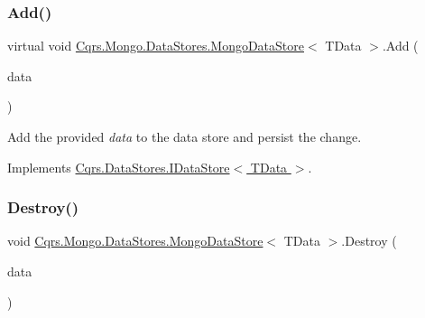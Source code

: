 \mbox{\label{classCqrs_1_1Mongo_1_1DataStores_1_1MongoDataStore_a38c242b255dc17cf8d19470fdf5a99bf}} 
\subsubsection{\texorpdfstring{Add()}{Add()}\hspace{0.1cm}{\footnotesize\ttfamily [2/2]}}
{\footnotesize\ttfamily virtual void \hyperlink{classCqrs_1_1Mongo_1_1DataStores_1_1MongoDataStore}{Cqrs.\+Mongo.\+Data\+Stores.\+Mongo\+Data\+Store}$<$ T\+Data $>$.Add (\begin{DoxyParamCaption}\item[{I\+Enumerable$<$ T\+Data $>$}]{data }\end{DoxyParamCaption})\hspace{0.3cm}{\ttfamily [virtual]}}



Add the provided {\itshape data}  to the data store and persist the change. 



Implements \hyperlink{interfaceCqrs_1_1DataStores_1_1IDataStore_a906f3f2f80db7a549a4170eca4653e26}{Cqrs.\+Data\+Stores.\+I\+Data\+Store$<$ T\+Data $>$}.

\mbox{\label{classCqrs_1_1Mongo_1_1DataStores_1_1MongoDataStore_af97319aef1f0484666d9ea12578b8df9}} 
\subsubsection{\texorpdfstring{Destroy()}{Destroy()}}
{\footnotesize\ttfamily void \hyperlink{classCqrs_1_1Mongo_1_1DataStores_1_1MongoDataStore}{Cqrs.\+Mongo.\+Data\+Stores.\+Mongo\+Data\+Store}$<$ T\+Data $>$.Destroy (\begin{DoxyParamCaption}\item[{T\+Data}]{data }\end{DoxyParamCaption})}



